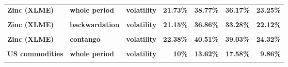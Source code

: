 \documentclass[
  authoryear,
  preprint,
  3p]{elsarticle}
\begin{document}
\begin{longtable}[t]{>{}l>{}l>{}l>{}r>{}r>{}r>{}r}
\addlinespace
\textbf{Zinc (XLME)} & \textbf{whole period} & \textbf{volatility} & \textcolor[HTML]{4285f4}{\textbf{21.73\%}} & \textcolor[HTML]{4285f4}{\textbf{38.77\%}} & \textcolor[HTML]{4285f4}{\textbf{36.17\%}} & \textcolor[HTML]{4285f4}{\textbf{23.25\%}}\\
\textbf{\cellcolor{gray!10}{Zinc (XLME)}} & \textbf{\cellcolor{gray!10}{backwardation}} & \textbf{\cellcolor{gray!10}{mean}} & \textcolor[HTML]{4285f4}{\textbf{\cellcolor{gray!10}{-9.06\%}}} & \textcolor[HTML]{4285f4}{\textbf{\cellcolor{gray!10}{2.95\%}}} & \textcolor[HTML]{4285f4}{\textbf{\cellcolor{gray!10}{10.05\%}}} & \textcolor[HTML]{4285f4}{\textbf{\cellcolor{gray!10}{**29.42\%}}}\\
\textbf{Zinc (XLME)} & \textbf{backwardation} & \textbf{volatility} & \textcolor[HTML]{4285f4}{\textbf{21.15\%}} & \textcolor[HTML]{4285f4}{\textbf{36.86\%}} & \textcolor[HTML]{4285f4}{\textbf{33.28\%}} & \textcolor[HTML]{4285f4}{\textbf{22.12\%}}\\
\textbf{\cellcolor{gray!10}{Zinc (XLME)}} & \textbf{\cellcolor{gray!10}{contango}} & \textbf{\cellcolor{gray!10}{mean}} & \textcolor[HTML]{4285f4}{\textbf{\cellcolor{gray!10}{-0.13\%}}} & \textcolor[HTML]{4285f4}{\textbf{\cellcolor{gray!10}{37.11\%}}} & \textcolor[HTML]{4285f4}{\textbf{\cellcolor{gray!10}{5.43\%}}} & \textcolor[HTML]{4285f4}{\textbf{\cellcolor{gray!10}{-11.31\%}}}\\
\textbf{Zinc (XLME)} & \textbf{contango} & \textbf{volatility} & \textcolor[HTML]{4285f4}{\textbf{22.38\%}} & \textcolor[HTML]{4285f4}{\textbf{40.51\%}} & \textcolor[HTML]{4285f4}{\textbf{39.03\%}} & \textcolor[HTML]{4285f4}{\textbf{24.32\%}}\\
\addlinespace
\textbf{\cellcolor{gray!10}{US commodities}} & \textbf{\cellcolor{gray!10}{whole period}} & \textbf{\cellcolor{gray!10}{mean}} & \textcolor[HTML]{4285f4}{\textbf{\cellcolor{gray!10}{*6.89\%}}} & \textcolor[HTML]{4285f4}{\textbf{\cellcolor{gray!10}{**15.89\%}}} & \textcolor[HTML]{4285f4}{\textbf{\cellcolor{gray!10}{9.39\%}}} & \textcolor[HTML]{4285f4}{\textbf{\cellcolor{gray!10}{-0.18\%}}}\\
\textbf{US commodities} & \textbf{whole period} & \textbf{volatility} & \textcolor[HTML]{4285f4}{\textbf{10\%}} & \textcolor[HTML]{4285f4}{\textbf{13.62\%}} & \textcolor[HTML]{4285f4}{\textbf{17.58\%}} & \textcolor[HTML]{4285f4}{\textbf{9.86\%}}\\
\textbf{\cellcolor{gray!10}{US commodities}} & \textbf{\cellcolor{gray!10}{backwardation}} & \textbf{\cellcolor{gray!10}{mean}} & \textcolor[HTML]{4285f4}{\textbf{\cellcolor{gray!10}{***15.44\%}}} & \textcolor[HTML]{4285f4}{\textbf{\cellcolor{gray!10}{*15.66\%}}} & \textcolor[HTML]{4285f4}{\textbf{\cellcolor{gray!10}{13.4\%}}} & \textcolor[HTML]{4285f4}{\textbf{\cellcolor{gray!10}{6.82\%}}}\\

\end{longtable}
\end{document}
